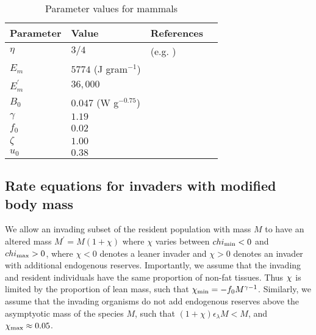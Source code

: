 \documentclass{pnastwo}
\begin{document}
\begin{article}



 \begin{table}[h]
\caption{Parameter values for mammals}
\label{param}
    \begin{center}
    \small
     \begin{tabular}{ p{1.2cm} p{3.2cm} l p{2.2cm}|}
     \hline
     Parameter & Value & References  \\
     \hline
   $\eta$ & $3/4$  &  (e.g. \cite{West:2001bv,moses2008rmo,hou}) \\
   $E_{m}$ & $5774$ (J gram$^{-1}$)  &  \cite{moses2008rmo,West:2001bv,hou} \\
   $E_{m}^{\prime}$ & $36,000$  & \cite{stryer,hou} \\
   $B_{0}$ & $0.047$ (W g$^{-0.75}$)    & \cite{hou}  \\
   $\gamma$ & $1.19$ & \cite{Lindstedt:1985hm} \\
   $f_{0}$ & $0.02$ & \cite{Lindstedt:1985hm}\\
   $\zeta$ & $1.00$  & \cite{Lindstedt:2002td} \\
   $u_{0}$ & $0.38$  & \cite{Lindstedt:2002td} \\

   \hline
    \end{tabular}
    \end{center}
   \end{table}


\subsection*{Rate equations for invaders with modified body mass}
We allow an invading subset of the resident population with mass $M$ to have an altered mass $M^\prime = M(1+\chi)$ where $\chi$ varies between $chi_{\rm min} <0$ and $chi_{\rm max}>0$, where $\chi<0$ denotes a leaner invader and $\chi > 0$ denotes an invader with additional endogenous reserves.
Importantly, we assume that the invading and resident individuals have the same proportion of non-fat tissues.
Thus $\chi_{\rm}$ is limited by the proportion of lean mass, such that $\chi_{\rm min} = -f_0M^{\gamma-1}$.
Similarly, we assume that the invading organisms do not add endogenous reserves above the asymptyotic mass of the species $M$, such that $(1+\chi)\epsilon_\lambda M < M$, and $\chi_{\rm max} \approx 0.05$.


\end{article}
\end{document}
